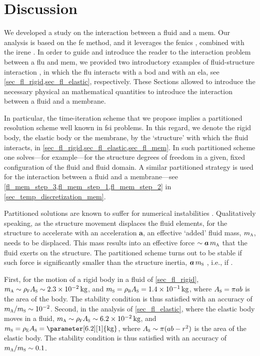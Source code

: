 \section{Discussion}
\label{sec_discussion}

\acresetall

We developed a  study on the interaction between a fluid and a \acl{mem}. Our analysis is based on the \ac{fe} method, and it leverages the \ac{fenics} \cite{loggAutomatedSolutionDifferential2012}, combined with the \ac{irene} \cite{worthmullerIRENEFluIdLayeR2025}.
In order to guide and introduce the reader to the interaction problem between a \acl{flu} and \acl{mem}, we provided two introductory examples of fluid-structure interaction \cite{kamenskyLectureNotesMAE}, in which the \acl{flu} interacts with a \acl{bod} and with an \acl{ela}, see \cref{sec_fl_rigid,sec_fl_elastic}, respectively. These Sections allowed to introduce the necessary physical an mathematical quantities to introduce the interaction between a fluid and a membrane.

In particular, the time-iteration scheme that we propose implies a partitioned resolution scheme \cite{felippaPartitionedAnalysisCoupled2001} well known in \ac{fsi} problems. In this regard, we denote  the rigid body, the elastic body or the membrane, by the `structure' with which the fluid interacts, in \cref{sec_fl_rigid,sec_fl_elastic,sec_fl_mem}. In such partitioned scheme one solves---for example---for the structure degrees of freedom in a given, fixed  configuration of the fluid and fluid domain. A similar partitioned strategy is used for the interaction between a fluid and a membrane---see \cref{fl_mem_step_3,fl_mem_step_1,fl_mem_step_2} in \cref{sec_temp_discretization_mem}.


Partitioned solutions are known to suffer for numerical instabilities \cite{forsterArtificialAddedMass2007}. Qualitatively speaking, as the structure movement displaces
the fluid elements, for the structure to accelerate with an acceleration $\bm a $,
an effective `added' fluid mass, $\madded$, needs to be displaced.
This mass results into an effective force  $\sim \bm{a}\,  \madded$ that the fluid exerts on the structure.
The partitioned scheme turns out to be stable if such force is significantly smaller than the structure inertia, ${\bm a} \, \mstr$ \cite{causinAddedmassEffectDesign2005}, i.e., if
\be\label{eq_added_mass}
\frac{\madded}{\mstr}.
\ee

First, for the motion of a rigid body in a fluid of \cref{sec_fl_rigid}, $\madded \sim \rhof A_\structure \sim 2.3 \times 10^{-2}\, \kg$, and $\mstr = \rhob A_\structure = 1.4 \times 10^{-1} \, \kg $, where $A_\structure = \pi a b$ is the area of the body. The stability condition  is thus satisfied  with an accuracy of $\madded/\mstr \sim 10^{-2}$.
% 
Second, in the analysis of  \cref{sec_fl_elastic}, where the elastic body moves in a fluid, $\madded \sim \rhof A_\structure \sim 6.2 \times 10^{-2}\, \kg$, and $\mstr = \rhoela A_\structure = \parameter[6.2][1]{\kg}$, where $A_\structure \sim \pi (a b - r^2)$ is the area of the elastic body. The stability condition  is thus satisfied with an accuracy of $\madded/\mstr \sim 0.1$.

